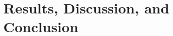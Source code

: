 \documentclass[doc,apacite,12pt]{apa6}
\begin{document}
\section{Results, Discussion, and Conclusion}



% 
\end{document}
